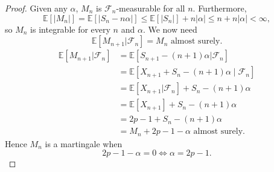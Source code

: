 \documentclass{article}
\begin{document}
\begin{proof}
Given any $\alpha$, $M_n$ is $\mathcal{F}_n$-measurable for all $n$. Furthermore, \[\mathbb{E}[|M_n|]=\mathbb{E}[|S_n-n\alpha|]\leq\mathbb{E}[|S_n|]+n|\alpha|\leq n+n|\alpha|<\infty,\] so $M_n$ is integrable for every $n$ and $\alpha$. We now need\[\mathbb{E}[M_{n+1}|\mathcal{F}_n]=M_n\text{ almost surely.}\]\begin{align*}\mathbb{E}[M_{n+1}|\mathcal{F}_n]&=\mathbb{E}[S_{n+1}-(n+1)\alpha|\mathcal{F}_n]\\&=\mathbb{E}\left[X_{n+1}+S_n-(n+1)\alpha\mid\mathcal{F}_n\right]\\&=\mathbb{E}[X_{n+1}
|\mathcal{F}_n]+S_n-(n+1)\alpha\\&=\mathbb{E}[X_{n+1}]+S_n-(n+1)\alpha\\&=2p-1+S_n-(n+1)\alpha\\&=M_n+2p-1-\alpha\text{ almost surely}.\end{align*}Hence $M_n$ is a martingale when \[2p-1-\alpha=0\iff \alpha=2p-1.\]


\end{proof}
\end{document}
